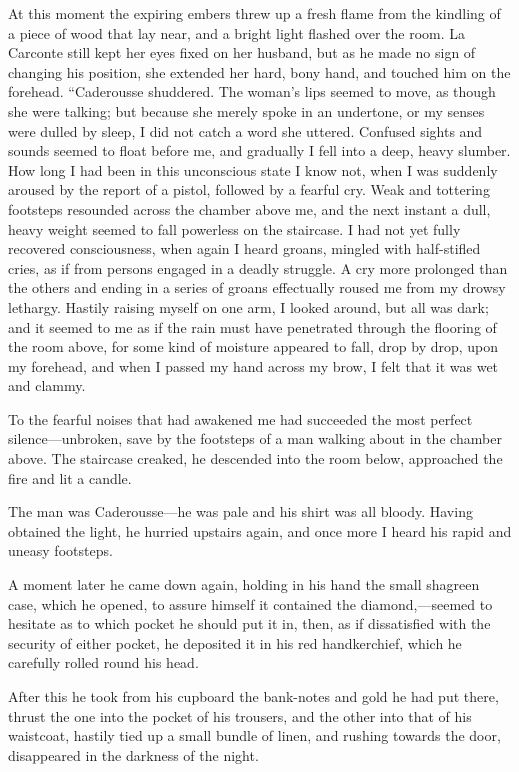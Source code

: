  At this moment the expiring embers threw up a fresh flame from the kindling of a piece of wood that lay near, and a bright light flashed over the room. La Carconte still kept her eyes fixed on her husband, but as he made no sign of changing his position, she extended her hard, bony hand, and touched him on the forehead.  “Caderousse shuddered. The woman's lips seemed to move, as though she were talking; but because she merely spoke in an undertone, or my senses were dulled by sleep, I did not catch a word she uttered. Confused sights and sounds seemed to float before me, and gradually I fell into a deep, heavy slumber. How long I had been in this unconscious state I know not, when I was suddenly aroused by the report of a pistol, followed by a fearful cry. Weak and tottering footsteps resounded across the chamber above me, and the next instant a dull, heavy weight seemed to fall powerless on the staircase. I had not yet fully recovered consciousness, when again I heard groans, mingled with half-stifled cries, as if from persons engaged in a deadly struggle. A cry more prolonged than the others and ending in a series of groans effectually roused me from my drowsy lethargy. Hastily raising myself on one arm, I looked around, but all was dark; and it seemed to me as if the rain must have penetrated through the flooring of the room above, for some kind of moisture appeared to fall, drop by drop, upon my forehead, and when I passed my hand across my brow, I felt that it was wet and clammy. 

 To the fearful noises that had awakened me had succeeded the most perfect silence—unbroken, save by the footsteps of a man walking about in the chamber above. The staircase creaked, he descended into the room below, approached the fire and lit a candle. 

 The man was Caderousse—he was pale and his shirt was all bloody. Having obtained the light, he hurried upstairs again, and once more I heard his rapid and uneasy footsteps. 

 A moment later he came down again, holding in his hand the small shagreen case, which he opened, to assure himself it contained the diamond,—seemed to hesitate as to which pocket he should put it in, then, as if dissatisfied with the security of either pocket, he deposited it in his red handkerchief, which he carefully rolled round his head. 

 After this he took from his cupboard the bank-notes and gold he had put there, thrust the one into the pocket of his trousers, and the other into that of his waistcoat, hastily tied up a small bundle of linen, and rushing towards the door, disappeared in the darkness of the night. 

